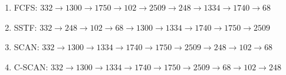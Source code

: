 \begin{latin}
    \begin{enumerate}
        \item FCFS: $332 \rightarrow 1300 \rightarrow 1750 \rightarrow 102 \rightarrow 2509 \rightarrow 248 \rightarrow 1334 \rightarrow 1740 \rightarrow 68$
        \item SSTF: $332 \rightarrow 248 \rightarrow 102 \rightarrow 68 \rightarrow 1300 \rightarrow 1334 \rightarrow 1740 \rightarrow 1750 \rightarrow 2509$
        \item SCAN: $332 \rightarrow 1300 \rightarrow 1334 \rightarrow 1740 \rightarrow 1750 \rightarrow 2509 \rightarrow 248 \rightarrow 102 \rightarrow 68$
        \item C-SCAN: $332 \rightarrow 1300 \rightarrow 1334 \rightarrow 1740 \rightarrow 1750 \rightarrow 2509 \rightarrow 68 \rightarrow 102 \rightarrow 248$
    \end{enumerate}
\end{latin}
